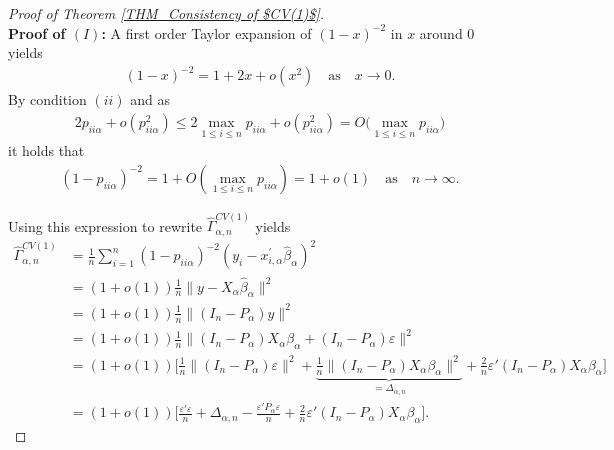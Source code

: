 \documentclass[Research_Module_ES.tex]{subfiles}
\begin{document}
\begin{proof}[Proof of Theorem \ref{THM_Consistency of $CV(1)$}]~\\
	\textbf{Proof of $(I)$:} A first order Taylor expansion of $(1-x)^{-2}$ in $x$ around $0$ yields 
	\begin{align}
	(1- x)^{-2} = 1+ 2 x + o(x^2) \quad \textrm{as} \quad x\to 0 .\label{proof_CV(1)_1}
	\end{align}
	By condition $(ii)$ and as
	\begin{align*}
	2p_{ii\alpha} + o(p_{ii\alpha}^2) 
	\le 2 \max_{1\le i \le n} p_{ii\alpha} +  o(p_{ii\alpha}^2) 
	= O\bigl(\max _{1\le i \le n} p_{ii\alpha}\bigr)
	\end{align*}
	it holds that 
	\begin{align*}
	(1- p_{ii\alpha})^{-2} = 1+ O(\max _{1\le i \le n} p_{ii\alpha}) 
	= 1 +o(1) \quad \textrm{as} \quad n \to \infty. 
	\end{align*}
	
	Using this expression to rewrite $\hat{\Gamma}_{\alpha,n}^{CV(1)}$ yields
	\begin{align}
	\hat{\Gamma}_{\alpha,n}^{CV(1)} &= \frac{1}{n}\sum_{i=1}^n (1- p_{ii\alpha})^{-2}(y_i-x_{i,\alpha}^\prime\hat{\beta}_\alpha)^2\nonumber\\
	&= (1+o(1))\frac{1}{n}\lVert y-X_{\alpha}\hat{\beta}_\alpha\rVert^2\nonumber\\
	&= (1+o(1))\frac{1}{n}\lVert (I_n-P_\alpha) y\rVert^2\nonumber\\
	&= (1+o(1))\frac{1}{n}\lVert (I_n-P_\alpha) X_\alpha\beta_\alpha +(I_n-P_\alpha)\varepsilon \rVert^2\nonumber\\
	&= (1+o(1))\biggl[\frac{1}{n}\lVert(I_n-P_\alpha)\varepsilon \rVert^2+ \underbrace{\frac{1}{n}\lVert (I_n-P_\alpha) X_\alpha\beta_\alpha\rVert^2}_{=\Delta_{\alpha,n}} +\frac{2}{n}\varepsilon'(I_n-P_\alpha) X_\alpha\beta_\alpha\biggr]\nonumber\\
	&= (1+o(1)) \biggl[\frac{\varepsilon'\varepsilon}{n} + \Delta_{\alpha,n} - \frac{\varepsilon'P_\alpha\varepsilon}{n} +\frac{2}{n}\varepsilon'(I_n-P_\alpha) X_\alpha\beta_\alpha\biggr]. \label{proof_CV(1)_2}
	\end{align}
	

\end{proof}
\end{document}
